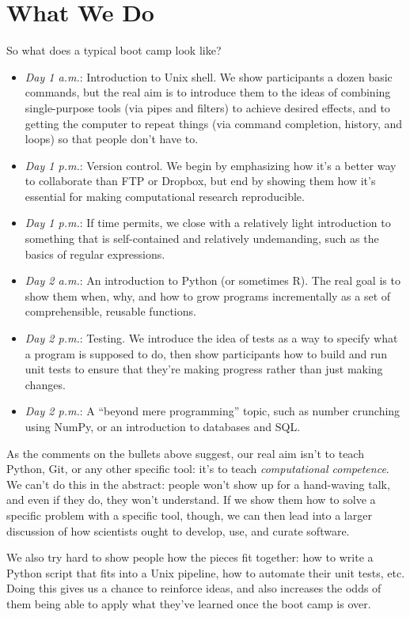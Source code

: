 \documentclass{article}
\begin{document}
\section{What We Do}

So what does a typical boot camp look like?

\begin{itemize}
\item
  \emph{Day 1 a.m.}: Introduction to Unix shell. We show participants a
  dozen basic commands, but the real aim is to introduce them to the
  ideas of combining single-purpose tools (via pipes and filters) to
  achieve desired effects, and to getting the computer to repeat things
  (via command completion, history, and loops) so that people don't have
  to.
\item
  \emph{Day 1 p.m.}: Version control. We begin by emphasizing how it's a
  better way to collaborate than FTP or Dropbox, but end by showing them
  how it's essential for making computational research reproducible.
\item
  \emph{Day 1 p.m.}: If time permits, we close with a relatively light
  introduction to something that is self-contained and relatively
  undemanding, such as the basics of regular expressions.
\item
  \emph{Day 2 a.m.}: An introduction to Python (or sometimes R). The
  real goal is to show them when, why, and how to grow programs
  incrementally as a set of comprehensible, reusable functions.
\item
  \emph{Day 2 p.m.}: Testing. We introduce the idea of tests as a way to
  specify what a program is supposed to do, then show participants how
  to build and run unit tests to ensure that they're making progress
  rather than just making changes.
\item
  \emph{Day 2 p.m.}: A ``beyond mere programming'' topic, such as number
  crunching using NumPy, or an introduction to databases and SQL.
\end{itemize}

As the comments on the bullets above suggest, our real aim isn't to
teach Python, Git, or any other specific tool: it's to teach
\emph{computational competence}. We can't do this in the abstract:
people won't show up for a hand-waving talk, and even if they do, they
won't understand. If we show them how to solve a specific problem with a
specific tool, though, we can then lead into a larger discussion of how
scientists ought to develop, use, and curate software.

We also try hard to show people how the pieces fit together: how to
write a Python script that fits into a Unix pipeline, how to automate
their unit tests, etc. Doing this gives us a chance to reinforce ideas,
and also increases the odds of them being able to apply what they've
learned once the boot camp is over.
\end{document}
